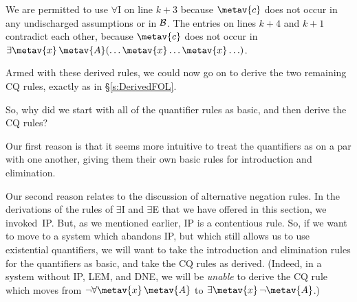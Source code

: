 \begin{fitchproof}
	\open
		\AS
	\close
	\open
		\AS
	\close
\end{fitchproof}\noindent
We are permitted to use $\forall$I on line $k+3$ because $\metav{c}$ does not occur in any  undischarged assumptions or in $\mathcal{B}$. The entries on lines $k+4$ and $k+1$ contradict each other, because $\metav{c}$ does not occur in $\exists \metav{x}\, \metav{A}(\ldots \metav{x} \ldots \metav{x} \ldots)$.

Armed with these derived rules, we could now go on to derive the two remaining CQ rules, exactly as in \S\ref{s:DerivedFOL}.

So, why did we start with all of the quantifier rules as basic, and then derive the CQ rules? 

Our first reason is that it seems more intuitive to treat the quantifiers as on a par with one another, giving them their own basic rules for introduction and elimination.

Our second reason relates to the discussion of alternative negation rules. In the derivations of the rules of $\exists$I and $\exists$E that we have offered in this section, we invoked~IP.  But, as we mentioned earlier, IP is a contentious rule. So, if we want to move to a system which abandons IP, but which still allows us to use existential quantifiers, we will want to take the introduction and elimination rules for the quantifiers as basic, and take the CQ rules as derived. (Indeed, in a system without IP, LEM, and DNE, we will be \emph{unable} to derive the CQ rule which moves from $\enot \forall \metav{x}\, \metav{A}$ to $\exists \metav{x}\, \enot \metav{A}$.)

